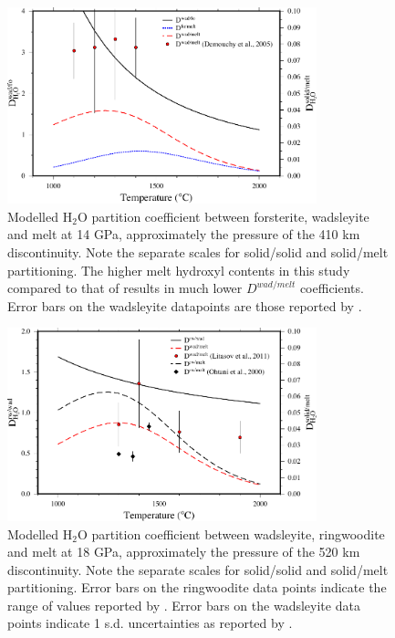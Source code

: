\documentclass[review]{elsarticle}
\begin{document}
\begin{figure}[ht!]
  \centering
  \includegraphics[width=0.8\textwidth]{figures/wad_fo_partitioning_410_edited}
  \caption{Modelled H$_2$O partition coefficient between forsterite, wadsleyite and melt at 14 GPa, approximately the pressure of the 410 km discontinuity. Note the separate scales for solid/solid and solid/melt partitioning. The higher melt hydroxyl contents in this study compared to that of \cite{DDFK2005} results in much lower $D^{wad/melt}$ coefficients. Error bars on the wadsleyite datapoints are those reported by \cite{DDFK2005}.}
  \label{fig:partitioning_wad_fo}
\end{figure}

\begin{figure}[ht!]
  \centering
  \includegraphics[width=0.8\textwidth]{figures/rw_wad_partitioning_520_edited}
  \caption{Modelled H$_2$O partition coefficient between wadsleyite, ringwoodite and melt at 18 GPa, approximately the pressure of the 520 km discontinuity. Note the separate scales for solid/solid and solid/melt partitioning. Error bars on the ringwoodite data points indicate the range of values reported by \cite{OMY2000}. Error bars on the wadsleyite data points indicate 1 s.d. uncertainties as reported by \cite{LSOK2011}.}
  \label{fig:partitioning_rw_wad}
\end{figure}
\end{document}
